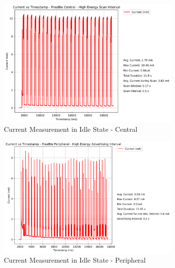 \begin{figure}[H]
    \begin{subfigure}{0.5\linewidth}
        \centering
        \includegraphics[width=0.8\linewidth]{chapters/Results/Current vs Timestamp - FreeBie Central High.png}
        \caption{Current Measurement in Idle State - Central}
        \label{fig:freebie_high_central}
    \end{subfigure}
    \begin{subfigure}{0.5\linewidth}
        \centering
        \includegraphics[width=0.8\linewidth]{chapters/Results/Current vs Timestamp - FreeBie Peripheral High.png}
        \caption{Current Measurement in Idle State - Peripheral}
        \label{fig:freebie_high_peripheral}
    \end{subfigure}
    \begin{center}
        \begin{subfigure}{0.5\linewidth}
            \centering

\end{subfigure}
\end{center}
\end{figure}
